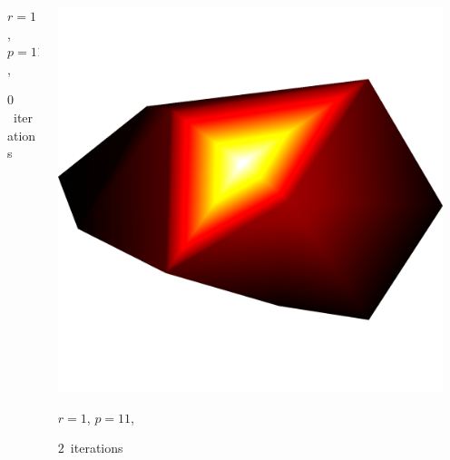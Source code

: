 \documentclass[aspectratio=169,t]{beamer}
\begin{document}
{\begin{columns}
\begin{column}{0.22\textwidth}
			{\footnotesize 
				\par \vspace{-1mm} $r=1$, $p=11$,
				\par \vspace{-1mm} $0$~iterations
			}
		\end{column}
		\begin{column}{0.22\textwidth}
			\centering
			\includegraphics[width=.85\textwidth]{data/synthetic_meshes/random_circle_tessellation_Dirac_delta_1_v11_f12_funcvals_2iter.png}
			{\footnotesize 
				\par \vspace{-1mm} $r=1$, $p=11$,
				\par \vspace{-1mm} $2$~iterations
			}
		\end{column}
		\begin{column}{0.17\textwidth}~\end{column}
	\end{columns}
	\vspace*{4mm}
	\begin{columns}
		\begin{column}{0.17\textwidth}~\end{column}
		\begin{column}{0.22\textwidth}
			\centering

\end{column}
\end{columns}}
\end{document}
